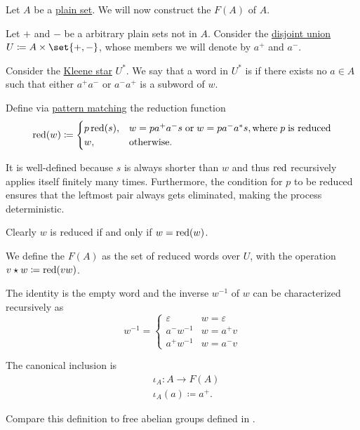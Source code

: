 \begin{definition}\label{def:free_group}\mimprovised
  Let \( A \) be a \hyperref[def:set]{plain set}. We will now construct the  \( F(A) \) of \( A \).

  Let \( + \) and \( - \) be a arbitrary plain sets not in \( A \). Consider the \hyperref[def:disjoint_union]{disjoint union} \( U \coloneqq A \times \set{ +, - } \), whose members we will denote by \( a^+ \) and \( a^- \).

  Consider the \hyperref[def:formal_language/kleene_star]{Kleene star} \( U^* \). We say that a word in \( U^* \) is  if there exists no \( a \in A \) such that either \( a^+ a^- \) or \( a^- a^+ \) is a subword of \( w \).

  Define via \hyperref[rem:evaluation]{pattern matching} the reduction function
  \begin{equation*}
    \red(w) \coloneqq \begin{cases}
      p \red(s), &w = p a^+ a^- s \T{or} w = p a^- a^* s, \T{where} p \T{is reduced} \\
      w,         &\T{otherwise.}
    \end{cases}
  \end{equation*}

  It is well-defined because \( s \) is always shorter than \( w \) and thus \( \operatorname{red} \) recursively applies itself finitely many times. Furthermore, the condition for \( p \) to be reduced ensures that the leftmost pair always gets eliminated, making the process deterministic.

  Clearly \( w \) is reduced if and only if \( w = \operatorname{red}(w) \).

  We define the  \( F(A) \) as the set of reduced words over \( U \), with the operation \( v \star w \coloneqq \operatorname{red}(vw) \).

  The identity is the empty word and the inverse \( w^{-1} \) of \( w \) can be characterized recursively as
  \begin{equation*}
    w^{-1} = \begin{cases}
      \varepsilon &w = \varepsilon \\
      a^- w^{-1}  &w = a^+ v \\
      a^+ w^{-1}  &w = a^- v
    \end{cases}
  \end{equation*}

  The canonical inclusion is
  \begin{equation*}
    \begin{aligned}
      &\iota_A: A \to F(A) \\
      &\iota_A(a) \coloneqq a^+.
    \end{aligned}
  \end{equation*}
\end{definition}
\begin{comments}
  \item Compare this definition to free abelian groups defined in .
\end{comments}

